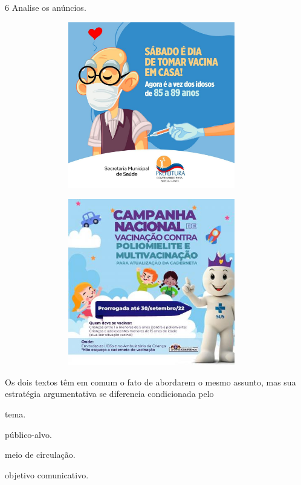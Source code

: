 \num{6} Analise os anúncios.

\begin{figure}[H]
\centering
\includegraphics[width=4.21103in,height=2.86458in]{./imgSAEB_8_POR/media/image29.png}
\end{figure}

\begin{figure}[H]
\centering
\includegraphics[width=4.21103in,height=2.86458in]{./imgSAEB_8_POR/media/image30.png}
\end{figure}

Os dois textos têm em comum o fato de abordarem o mesmo assunto, mas sua
estratégia argumentativa se diferencia condicionada pelo

\begin{escolha}
\item tema.

\item público-alvo.

\item meio de circulação.

\item objetivo comunicativo.
\end{escolha}

